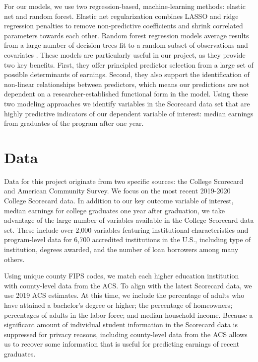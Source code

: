 \documentclass[a4paper, 12pt]{article}
\begin{document}
For our models, we use two regression-based, machine-learning methods: elastic net and random forest. Elastic net regularization combines LASSO and ridge regression penalties to remove non-predictive coefficients and shrink correlated parameters towards each other. Random forest regression models average results from a large number of decision trees fit to a random subset of observations and covariates \parencite{Hastie_etal_2016}. These models are particularly useful in our project, as they provide two key benefits. First, they offer principled predictor selection from a large set of possible determinants of earnings. Second, they also support the identification of non-linear relationships between predictors, which means our predictions are not dependent on a researcher-established functional form in the model. Using these two modeling approaches we identify variables in the Scorecard data set that are highly predictive indicators of our dependent variable of interest: median earnings from graduates of the program after one year.

\section*{Data}

Data for this project originate from two specific sources: the College Scorecard and American Community Survey. We focus on the most recent 2019-2020 College Scorecard data. In addition to our key outcome variable of interest, median earnings for college graduates one year after graduation, we take advantage of the large number of variables available in the College Scorecard data set. These include over 2,000 variables featuring institutional characteristics and program-level data for 6,700 accredited institutions in the U.S., including type of institution, degrees awarded, and the number of loan borrowers among many others.

Using unique county FIPS codes, we match each higher education institution with county-level data from the ACS. To align with the latest Scorecard data, we use 2019 ACS estimates. At this time, we include the percentage of adults who have attained a bachelor's degree or higher; the percentage of homeowners; percentages of adults in the labor force; and median household income. Because a significant amount of individual student information in the Scorecard data is suppressed for privacy reasons, including county-level data from the ACS allows us to recover some information that is useful for predicting earnings of recent graduates.
\end{document}
